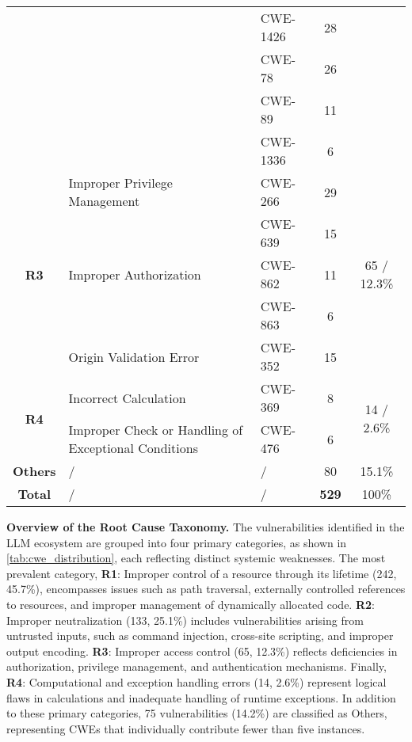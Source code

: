 \begin{table*}[t]
\begin{tabular}{c|llc|c}
&  & CWE-1426 & 28 & \\
&  & CWE-78 & 26 & \\
&  & CWE-89 & 11 & \\
&  & CWE-1336 & 6 & \\
\hline
\multirow{5}{*}{\textbf{R3}} 
& \multirow{1}{*}{Improper Privilege Management} 
& CWE-266 & 29 & \multirow{5}{*}{65 / 12.3\%} \\
\cline{2-4}
& \multirow{3}{*}{Improper Authorization} 
& CWE-639 & 15 & \\
&  & CWE-862 & 11 & \\
&  & CWE-863 & 6 & \\
\cline{2-4}
& \multirow{1}{*}{Origin Validation Error} 
& CWE-352 & 15 & \\
\hline
\multirow{2}{*}{\textbf{R4}} 
& Incorrect Calculation & CWE-369 & 8 & \multirow{2}{*}{14 / 2.6\%} \\
& Improper Check or Handling of Exceptional Conditions & CWE-476 & 6 & \\
\hline
\multirow{1}{*}{\textbf{Others}} 
& / & / & 80 & 15.1\% \\
\hline
\textbf{Total} & / & / & \textbf{529} & 100\% \\
\hline
\end{tabular}
\end{table*}

\noindent \textbf{Overview of the Root Cause Taxonomy.}
The vulnerabilities identified in the LLM ecosystem are grouped into four primary categories, as shown in \autoref{tab:cwe_distribution}, each reflecting distinct systemic weaknesses. The most prevalent category, \textbf{R1}: Improper control of a resource through its lifetime (242, 45.7\%), encompasses issues such as path traversal, externally controlled references to resources, and improper management of dynamically allocated code. 
\textbf{R2}: Improper neutralization (133, 25.1\%) includes vulnerabilities arising from untrusted inputs, such as command injection, cross-site scripting, and improper output encoding. 
\textbf{R3}: Improper access control (65, 12.3\%) reflects deficiencies in authorization, privilege management, and authentication mechanisms.
Finally, \textbf{R4}: Computational and exception handling errors (14, 2.6\%) represent logical flaws in calculations and inadequate handling of runtime exceptions. 
In addition to these primary categories, 75 vulnerabilities (14.2\%) are classified as Others, representing CWEs that individually contribute fewer than five instances. 

